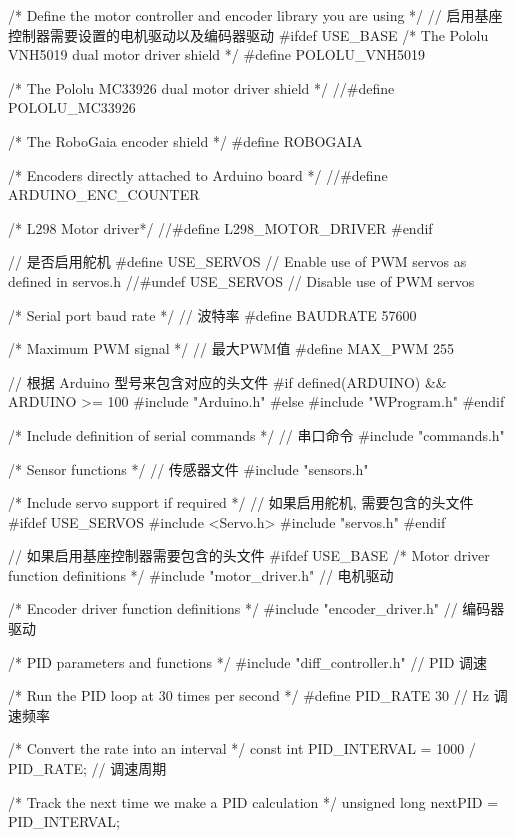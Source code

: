 \documentclass[openany, fontset=windowsold]{ctexbook}
\theoremstyle{kaiti}
\theoremstyle{normal}
\begin{document}
\begin{cpp}
  /* Define the motor controller and encoder library you are using */
  // 启用基座控制器需要设置的电机驱动以及编码器驱动
  #ifdef USE_BASE
    /* The Pololu VNH5019 dual motor driver shield */
    #define POLOLU_VNH5019

    /* The Pololu MC33926 dual motor driver shield */
    //#define POLOLU_MC33926

    /* The RoboGaia encoder shield */
    #define ROBOGAIA

    /* Encoders directly attached to Arduino board */
    //#define ARDUINO_ENC_COUNTER

    /* L298 Motor driver*/
    //#define L298_MOTOR_DRIVER
  #endif

  // 是否启用舵机
  #define USE_SERVOS  // Enable use of PWM servos as defined in servos.h
  //#undef USE_SERVOS     // Disable use of PWM servos

  /* Serial port baud rate */
  // 波特率
  #define BAUDRATE     57600

  /* Maximum PWM signal */
  // 最大PWM值
  #define MAX_PWM        255

  // 根据 Arduino 型号来包含对应的头文件
  #if defined(ARDUINO) && ARDUINO >= 100
  #include "Arduino.h"
  #else
  #include "WProgram.h"
  #endif

  /* Include definition of serial commands */
  // 串口命令
  #include "commands.h"

  /* Sensor functions */
  // 传感器文件
  #include "sensors.h"

  /* Include servo support if required */
  // 如果启用舵机, 需要包含的头文件
  #ifdef USE_SERVOS
    #include <Servo.h>
    #include "servos.h"
  #endif

  // 如果启用基座控制器需要包含的头文件
  #ifdef USE_BASE
    /* Motor driver function definitions */
    #include "motor_driver.h" // 电机驱动

    /* Encoder driver function definitions */
    #include "encoder_driver.h"  // 编码器驱动

    /* PID parameters and functions */
    #include "diff_controller.h" // PID 调速

    /* Run the PID loop at 30 times per second */
    #define PID_RATE           30     // Hz 调速频率

    /* Convert the rate into an interval */
    const int PID_INTERVAL = 1000 / PID_RATE; // 调速周期

    /* Track the next time we make a PID calculation */
    unsigned long nextPID = PID_INTERVAL;


\end{cpp}
\end{document}

